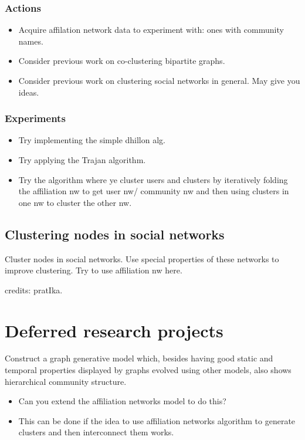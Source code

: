 \subsubsection{Actions}
\begin{itemize}
 \item Acquire affilation network data to experiment with: ones with community names.
 \item Consider previous work on co-clustering bipartite graphs.
 \item Consider previous work on clustering social networks in general. May give you ideas.
\end{itemize}

\subsubsection{Experiments}
\begin{itemize}
 \item Try implementing the simple dhillon alg.
 \item Try applying the Trajan algorithm.
 \item Try the algorithm where ye cluster users and clusters by iteratively folding the affiliation nw to get user nw/ community nw and then using clusters in one nw to cluster the other nw.
\end{itemize}

\subsection{Clustering nodes in social networks}
Cluster nodes in social networks. Use special properties of these networks to improve clustering. Try to use affiliation nw here.

credits: pratIka.

\section{Deferred research projects}
Construct a graph generative model which, besides having good static and temporal properties displayed by graphs evolved using other models, also shows hierarchical community structure.

\begin{itemize}
\item Can you extend the affiliation networks model to do this?
\item This can be done if the idea to use affiliation networks algorithm to generate clusters and then interconnect them works.
\end{itemize}

